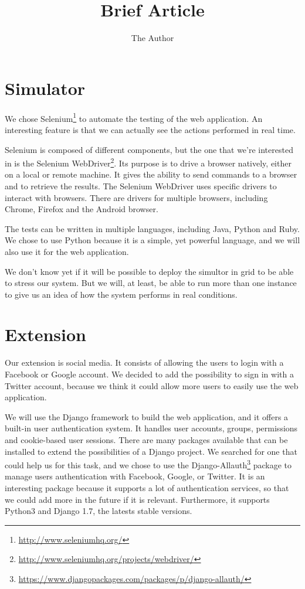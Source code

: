 \documentclass[11pt, a4paper]{article}   	%
\title{Brief Article}
\author{The Author}
\begin{document}

\section{Simulator}

We chose Selenium\footnote{\url{http://www.seleniumhq.org/}} to automate the testing of the web application.
An interesting feature is that we can actually see the actions performed in real time.

Selenium is composed of different components, but the one that we're interested in is the Selenium WebDriver\footnote{\url{http://www.seleniumhq.org/projects/webdriver/}}. %
Its purpose is to drive a browser natively, either on a local or remote machine.
It gives the ability to send commands to a browser and to retrieve the results.
The Selenium WebDriver uses specific drivers to interact with browsers.
There are drivers for multiple browsers, including Chrome, Firefox and the Android browser.

\medskip
The tests can be written in multiple languages, including Java, Python and Ruby.
We chose to use Python because it is a simple, yet powerful language, and we will also use it for the web application.

\medskip
We don't know yet if it will be possible to deploy the simultor in grid to be able to stress our system.
But we will, at least, be able to run more than one instance to give us an idea of how the system performs in real conditions.


\section{Extension}

Our extension is social media.
It consists of allowing the users to login with a Facebook or Google account.
We decided to add the possibility to sign in with a Twitter account, because we think it could allow more users to easily use the web application.

\medskip
We will use the Django framework to build the web application, and it offers a built-in user authentication system.
It handles user accounts, groups, permissions and cookie-based user sessions. 
There are many packages available that can be installed to extend the possibilities of a Django project.
We searched for one that could help us for this task, and we chose to use the Django-Allauth\footnote{\url{https://www.djangopackages.com/packages/p/django-allauth/}} package to manage users authentication with Facebook, Google, or Twitter.
It is an interesting package because it supports a lot of authentication services, so that we could add more in the future if it is relevant.
Furthermore, it supports Python3 and Django 1.7, the latests stable versions.
\end{document}

